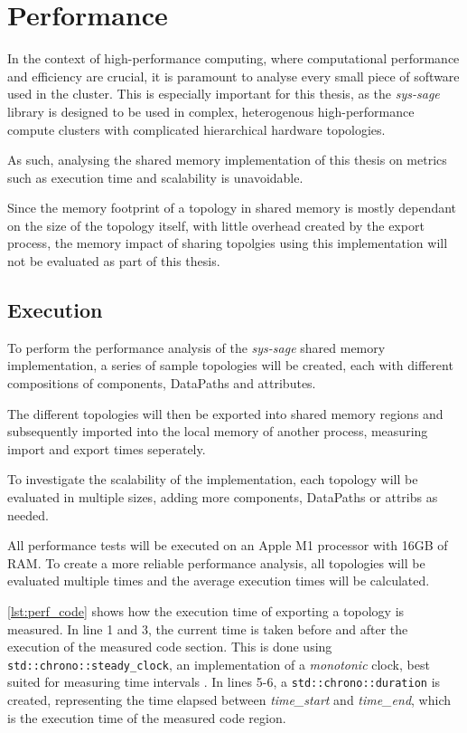 \chapter{Performance}\label{chapter:Performance}
In the context of high-performance computing, where computational performance and efficiency are crucial, it is paramount to analyse every small piece of software used in the cluster.
This is especially important for this thesis, as the \emph{sys-sage} library is designed to be used in complex, heterogenous high-performance compute clusters with complicated hierarchical hardware topologies.

As such, analysing the shared memory implementation of this thesis on metrics such as execution time and scalability is unavoidable.

Since the memory footprint of a topology in shared memory is mostly dependant on the size of the topology itself, with little overhead created by the export process,
the memory impact of sharing topolgies using this implementation will not be evaluated as part of this thesis.

\section{Execution}
To perform the performance analysis of the \emph{sys-sage} shared memory implementation, a series of sample topologies will be created, each with different compositions of components, DataPaths and attributes.

The different topologies will then be exported into shared memory regions and subsequently imported into the local memory of another process,
measuring import and export times seperately.

To investigate the scalability of the implementation, each topology will be evaluated in multiple sizes, adding more components, DataPaths or attribs as needed.

All performance tests will be executed on an Apple M1 processor with 16GB of RAM.
To create a more reliable performance analysis, all topologies will be evaluated multiple times and the average execution times will be calculated.

\autoref{lst:perf_code} shows how the execution time of exporting a topology is measured. In line 1 and 3, the current time is taken before and after the execution of the measured code section.
This is done using \lstinline|std::chrono::steady_clock|, an implementation of a \emph{monotonic} clock, best suited for measuring time intervals \cite{monotonic_clock}.
In lines 5-6, a \lstinline|std::chrono::duration| is created, representing the time elapsed between \emph{time\_start} and \emph{time\_end}, which is the execution time of the measured code region.

